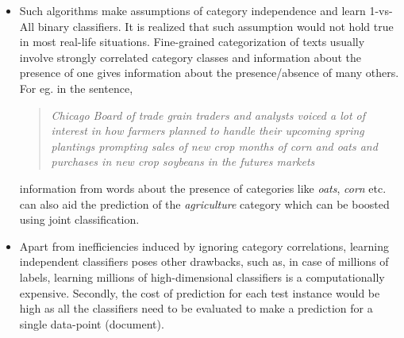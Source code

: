 \begin{itemize}

\item Such algorithms make assumptions of category independence and learn 1-vs-All binary classifiers. It is realized that such assumption would not hold true in most real-life situations. Fine-grained categorization of texts usually involve strongly correlated category classes and information about the presence of one gives information about the presence/absence of many others. For eg. in the sentence, 
\begin{quote} 
\centering 
\emph{Chicago Board of trade grain traders and analysts voiced a lot of interest in how farmers planned to handle their upcoming spring plantings prompting sales of new crop months of corn and oats and purchases in new crop soybeans in the futures markets}
\end{quote}
information from words about the presence of categories like \emph{oats}, \emph{corn} etc. can also aid the prediction of the \emph{agriculture} category which can be boosted using joint classification.
\item 
Apart from inefficiencies induced by ignoring category correlations, learning independent classifiers poses other drawbacks, such as, in case of millions of labels, learning millions of high-dimensional classifiers is a computationally expensive. Secondly, the cost of prediction for each test instance would be high as all the classifiers need to be evaluated to make a prediction for a single data-point (document).
\end{itemize}


